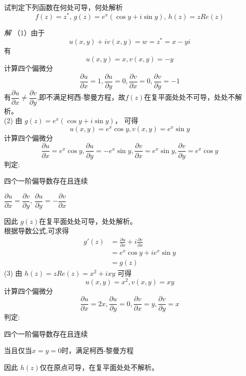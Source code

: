 \begin{example} \label{ex:gz}
试判定下列函数在何处可导，何处解析
  \[ f(z) = z^*, \, g(z) = e^x(\cos y + i \sin y), \,h(z) = z Re(z)\]    
\end{example}
\emph{解}
（1）由于 \[ u(x,y) + iv(x,y) = w = z^* = x -yi \]
    有 \[ u(x,y) =x, v(x,y) =-y\] 
计算四个偏微分  
     \[ \frac{\partial u}{\partial x} =1, \frac{\partial u}{\partial  y }=0, \frac{\partial v}{\partial x} =0, \frac{\partial v}{\partial y} =-1\]
     有$ \dfrac{\partial u}{\partial x} \ne \dfrac{\partial v}{\partial y} $,即不满足柯西-黎曼方程，故$f(z)$在复平面处处不可导，处处不解析。\\
(2) 由 $g(z) = e^x(\cos y + i \sin y)$， 可得 
     \[ u(x,y) =e^x\cos y, v(x,y) =e^x \sin y\] 
     计算四个偏微分 
     \[ \frac{\partial u}{\partial x} =e^x\cos y, \frac{\partial u}{\partial  y }=- e^x \sin  y, \frac{\partial v}{\partial x} =e^x \sin y, \frac{\partial v}{\partial y} =e^x \cos  y\]
     判定:\\
     \begin{inparaenum}[(i)]
       \item 四个一阶偏导数存在且连续\\
       \item $\dfrac{\partial u}{\partial x} = \dfrac{\partial v}{\partial y}, \, \dfrac{\partial u}{\partial  y } = -   \dfrac{\partial v}{\partial x}$
     \end{inparaenum}
因此 $g(z)$在复平面处处可导，处处解析。\\
根据导数公式,可求得  
    \[ \begin{aligned}
      g'(z) &= \frac{\partial u}{\partial x} + i \frac{\partial v }{\partial x} \\ 
      &= e^x\cos y +i e^x \sin y  \\
      &= g(z)
    \end{aligned}\]
(3) 由 $h(z) = z Re(z) = x^2 + i xy$ 可得
    \[ u(x,y) =x^2, v(x,y) =xy\] 
    计算四个偏微分 
    \[ \frac{\partial u}{\partial x} =2 x, \frac{\partial u}{\partial  y }=0, \frac{\partial v}{\partial x} =y, \frac{\partial v}{\partial y} =x\]
    判定:\\
    \begin{inparaenum}[(i)]
      \item 四个一阶偏导数存在且连续\\
      \item 当且仅当$x=y=0$时，满足柯西-黎曼方程
    \end{inparaenum}
因此 $h(z)$仅在原点可导，在复平面处处不解析。


